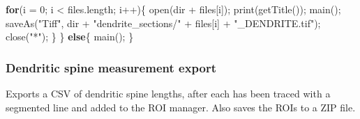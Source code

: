 \documentclass[
  12pt,
  a4paper,
]{book}
\newenvironment{Shaded}{}{}
\newcommand{\ControlFlowTok}[1]{\textcolor[rgb]{0.00,0.44,0.13}{\textbf{#1}}}
\newcommand{\DecValTok}[1]{\textcolor[rgb]{0.25,0.63,0.44}{#1}}
\newcommand{\NormalTok}[1]{#1}
\newcommand{\OperatorTok}[1]{\textcolor[rgb]{0.40,0.40,0.40}{#1}}
\newcommand{\StringTok}[1]{\textcolor[rgb]{0.25,0.44,0.63}{#1}}
\begin{document}
\begin{Shaded}
\begin{Highlighting}[]
    \ControlFlowTok{for}\OperatorTok{(}\NormalTok{i }\OperatorTok{=} \DecValTok{0}\OperatorTok{;}\NormalTok{ i }\OperatorTok{\textless{}}\NormalTok{ files}\OperatorTok{.}\NormalTok{length}\OperatorTok{;}\NormalTok{ i}\OperatorTok{++)\{}
\NormalTok{        open}\OperatorTok{(}\NormalTok{dir }\OperatorTok{+}\NormalTok{ files}\OperatorTok{[}\NormalTok{i}\OperatorTok{]);}
\NormalTok{        print}\OperatorTok{(}\NormalTok{getTitle}\OperatorTok{());}
\NormalTok{        main}\OperatorTok{();}
\NormalTok{        saveAs}\OperatorTok{(}\StringTok{"Tiff"}\OperatorTok{,}\NormalTok{ dir }\OperatorTok{+} \StringTok{"dendrite\_sections/"} \OperatorTok{+}\NormalTok{ files}\OperatorTok{[}\NormalTok{i}\OperatorTok{]} \OperatorTok{+} \StringTok{"\_DENDRITE.tif"}\OperatorTok{);}
\NormalTok{        close}\OperatorTok{(}\StringTok{"*"}\OperatorTok{);}
    \OperatorTok{\}}
\OperatorTok{\}}
\ControlFlowTok{else}\OperatorTok{\{}
\NormalTok{    main}\OperatorTok{();}
\OperatorTok{\}}
\end{Highlighting}
\end{Shaded}

\subsubsection{Dendritic spine measurement export}\label{dendritic-spine-measurement-export}

Exports a CSV of dendritic spine lengths, after each has been traced with a segmented line and added to the ROI manager. Also saves the ROIs to a ZIP file.
\end{document}
